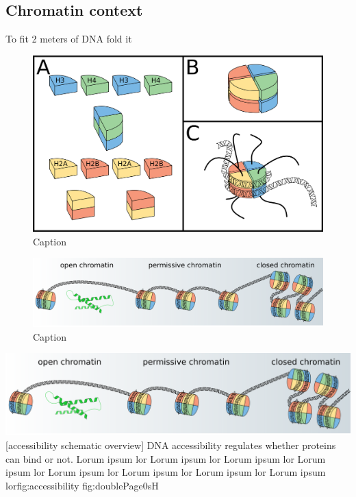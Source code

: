 \subsection{Chromatin context}

To fit 2 meters of DNA fold it

\begin{figure}[H]
    \includegraphics[width=\linewidth]{ch.introduction/imgs/histones.png}
    \caption{Caption}
    \label{fig:histones}
\end{figure}

\begin{figure}[H]
    \includegraphics[width=\linewidth]{ch.introduction/imgs/accessibility_horizontal.png}
    \caption{Caption}
    \label{fig:accessibility}
\end{figure}

{\includegraphics[width=1.6\textwidth]
{ch.introduction/imgs/accessibility_horizontal.png}}
[accessibility schematic overview]
{DNA accessibility regulates whether proteins can bind or not. Lorum ipsum lor Lorum ipsum lor Lorum ipsum lor Lorum ipsum lor Lorum ipsum lor Lorum ipsum lor Lorum ipsum lor Lorum ipsum lor}{fig:accessibility}
    {fig:doublePage0sH}


